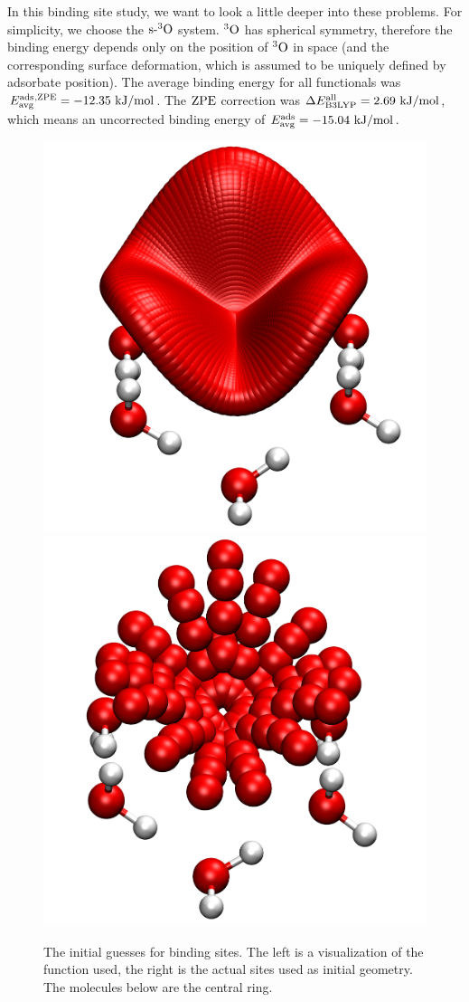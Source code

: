 In this binding site study, we want to look a little deeper into these problems. For
simplicity, we choose the $\text{s-}{^3\text{O}}$ system. ${^3\text{O}}$ has spherical symmetry, 
therefore the binding energy depends only on the position of ${^3\text{O}}$ in space
(and the corresponding surface deformation, which is assumed to be uniquely
defined by adsorbate position).
The average binding energy for
all functionals was \mbox{$E_{\text {avg}}^{\text{ads}}{^{\text{,ZPE}}}=-12.35~\text {kJ/mol}$}. The $\text{ZPE}$ correction was
\mbox{$\Delta E^{\text{all}}_{\text{B3LYP}}=2.69~\text {kJ/mol}$}, which means an uncorrected binding energy
of \mbox{$E_{\text {avg}}^{\text{ads}}=-15.04~\text {kJ/mol}$}.

\begin{figure}[t!]
\centering
\includegraphics[width=.49\textwidth]{./img/SiteSnapshotMany.png}
\includegraphics[width=.49\textwidth]{./img/SiteSnapshotOriginal.png}
\caption{The initial guesses for binding sites. The left is a visualization of the function
used, the right is the actual sites used as initial geometry. The molecules
below are the central ring.}
\label{Fig:Adv:BindingSitesGuess}
\end{figure}

